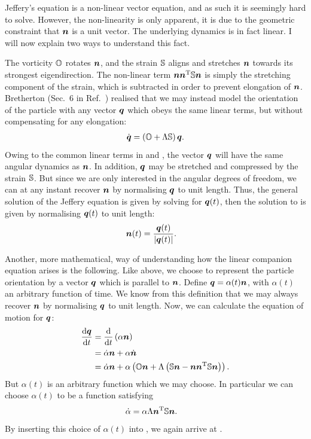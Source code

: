 \documentclass[thesis.tex]{subfiles}
\begin{document}
Jeffery's equation is a non-linear vector equation, and as such it is seemingly hard to solve. However, the non-linearity is only apparent, it is due to the geometric constraint that $\mbox{\boldmath$n$}$ is a unit vector. The underlying dynamics is in fact linear. I will now explain two ways to understand this fact.

The vorticity $\mathbb{O}$ rotates $\mbox{\boldmath$n$}$, and the strain $\mathbb{S}$ aligns and stretches $\mbox{\boldmath$n$}$ towards its strongest eigendirection. The non-linear term $\mbox{\boldmath$n$} \mbox{\boldmath$n$}^{\mathrm T} \mathbb{S} \mbox{\boldmath$n$}$ is simply the stretching component of the strain, which is subtracted in order to prevent elongation of $\mbox{\boldmath$n$}$. Bretherton (Sec.~6 in Ref.~\cite{bretherton1962}) realised that we may instead model the orientation of the particle with any vector $\mbox{\boldmath$q$}$ which obeys the same linear terms, but without compensating for any elongation:
\begin{align}
	\dot{\ve q} = \left(\ma O + \Lambda \ma S\right) \ve q.\eqnlab{jefferyq}
\end{align}
Owing to the common linear terms in  and , the vector $\mbox{\boldmath$q$}$ will have the same angular dynamics as $\mbox{\boldmath$n$}$. In addition, $\mbox{\boldmath$q$}$ may be stretched and compressed by the strain $\mathbb{S}$. But since we are only interested in the angular degrees of freedom, we can at any instant recover $\mbox{\boldmath$n$}$ by normalising $\mbox{\boldmath$q$}$ to unit length. Thus, the general solution of the Jeffery equation is given by solving  for $\mbox{\boldmath$q$}(t)$, then the solution to  is given by normalising $\mbox{\boldmath$q$}(t)$ to unit length:
\begin{align}
	\ve n(t) &= \frac{\ve q(t)}{|\ve q(t)|}.\eqnlab{jefferysolution0}
\end{align}

Another, more mathematical, way of understanding how the linear companion equation  arises is the following. Like above, we choose to represent the particle orientation by a vector $\mbox{\boldmath$q$}$ which is parallel to $\mbox{\boldmath$n$}$. Define $\mbox{\boldmath$q$} = \alpha(t)\mbox{\boldmath$n$}$, with $\alpha(t)$ an arbitrary function of time. We know from this definition that we may always recover $\mbox{\boldmath$n$}$ by normalising $\mbox{\boldmath$q$}$ to unit length. Now, we can calculate the equation of motion for $\mbox{\boldmath$q$}$:
\begin{align}
	\diff{\ve q}{t} &= \diff{}{t}\left(\alpha \ve n\right) \nn \\
	&= \dot \alpha \ve n + \alpha \dot{\ve n} \nn\\
	&= \dot \alpha \ve n + \alpha \left(\ma O \ve n + \Lambda \left(\ma S \ve n - \ve n \ve n \transpose \ma S \ve n\right)\right). \eqnlab{jefferyderivation1}
\end{align}
But $\alpha(t)$ is an arbitrary function which we may choose. In particular we can choose $\alpha(t)$ to be a function satisfying
\begin{align*}
	\dot \alpha &= \alpha \Lambda \mbox{\boldmath$n$}^{\mathrm T} \mathbb{S} \mbox{\boldmath$n$}.
\end{align*}
By inserting this choice of $\alpha(t)$ into , we again arrive at .
\end{document}
